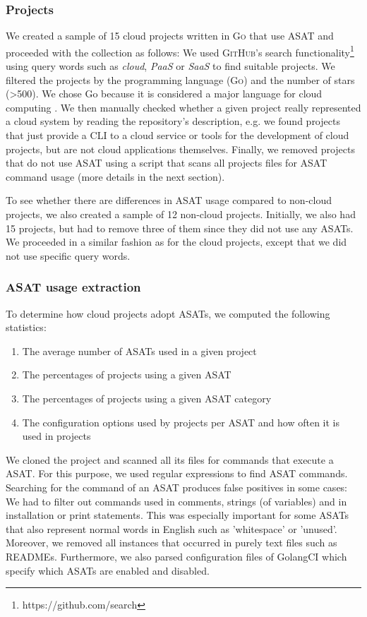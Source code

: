 \documentclass{seal_article}
\begin{document}
\subsubsection{Projects}
We created a sample of 15 cloud projects written in \textsc{Go} that use ASAT and proceeded with the collection as follows: We used \textsc{GitHub}'s search functionality\footnote{https://github.com/search} using query words such as \textit{cloud}, \textit{PaaS} or \textit{SaaS} to find suitable projects. We filtered the projects by the programming language (\textsc{Go}) and the number of stars (>500). We chose Go because it is considered a major language for cloud computing \cite{thenewstack}. We then manually checked whether a given project really represented a cloud system by reading the repository's description, e.g. we found projects that just provide a CLI to a cloud service or tools for the development of cloud projects, but are not cloud applications themselves. Finally, we removed projects that do not use ASAT using a script that scans all projects files for ASAT command usage (more details in the next section).

To see whether there are differences in ASAT usage compared to non-cloud projects, we also created a sample of 12 non-cloud projects. Initially, we also had 15 projects, but had to remove three of them since they did not use any ASATs. We proceeded in a similar fashion as for the cloud projects, except that we did not use specific query words.

\subsubsection{ASAT usage extraction}
To determine how cloud projects adopt ASATs, we computed the following statistics:
\begin{enumerate}
    \item The average number of ASATs used in a given project
    \item The percentages of projects using a given ASAT
    \item The percentages of projects using a given ASAT category
    \item The configuration options used by projects per ASAT and how often it is used in projects
\end{enumerate}

\noindent We cloned the project and scanned all its files for commands that execute a ASAT. For this purpose, we used regular expressions to find ASAT commands. Searching for the command of an ASAT produces false positives in some cases: We had to filter out commands used in comments, strings (of variables) and in installation or print statements. This was especially important for some ASATs that also represent normal words in English such as 'whitespace' or 'unused'. Moreover, we removed all instances that occurred in purely text files such as READMEs. Furthermore, we also parsed configuration files of GolangCI which specify which ASATs are enabled and disabled. 
\end{document}
